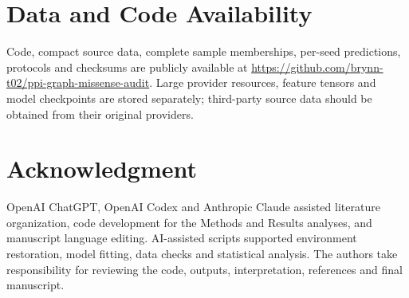 \documentclass[conference]{IEEEtran}
\begin{document}
\section*{Data and Code Availability}

Code, compact source data, complete sample memberships, per-seed predictions, protocols and checksums are publicly available at \url{https://github.com/brynn-t02/ppi-graph-missense-audit}. Large provider resources, feature tensors and model checkpoints are stored separately; third-party source data should be obtained from their original providers.

\section*{Acknowledgment}

OpenAI ChatGPT, OpenAI Codex and Anthropic Claude assisted literature organization, code development for the Methods and Results analyses, and manuscript language editing. AI-assisted scripts supported environment restoration, model fitting, data checks and statistical analysis. The authors take responsibility for reviewing the code, outputs, interpretation, references and final manuscript.
\end{document}
